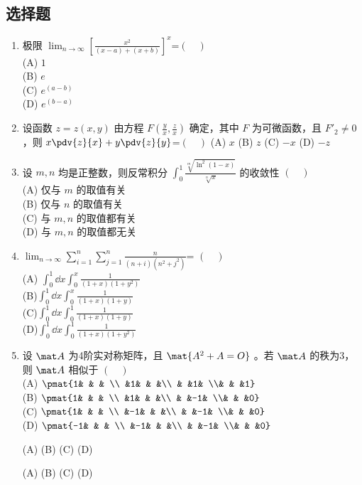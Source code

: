 
\subsection{选择题}
\begin{enumerate}
\item 极限  $\displaystyle \lim_{n\to\infty}[\frac{x^2}{(x-a)+(x+b)}]^x$=$(\quad )$\\
(A) $1$\\
(B) $e$\\
(C) $e^(a-b)$\\
(D) $e^(b-a)$
\item  设函数 $z=z(x,y)$ 由方程 $\displaystyle F(\frac{y}{x},\frac{z}{x})$ 确定，其中 $F$ 为可微函数，且 $F'_2 \neq0$ ，则  $\displaystyle x \pdv{z}{x}+y\pdv{z}{y}$=$(\quad )$
(A)  $x$
(B)  $z$
(C) $-x$
(D)  $-z$
\item 设 $m,n$ 均是正整数，则反常积分 $\displaystyle \int_0^1 \frac{\sqrt[m]{\ln^2(1-x)}}{\sqrt[n]{x}}$ 的收敛性 $(\quad )$\\
(A) 仅与 $m$ 的取值有关\\
(B) 仅与 $n$ 的取值有关\\
(C)  与 $m,n$ 的取值都有关\\
(D)  与 $m,n$ 的取值都无关
\item $\displaystyle \lim_{n\to\infty} \sum_{i=1}^n \sum_{j=1}^n \frac{n}{(n+i)(n^2+j^2)}$= $(\quad )$\\
(A) $\displaystyle \int_{0}^{1}\dd{x}\int_{0}^{x} \frac{1}{(1+x)(1+y^2)}$\\
(B)$\displaystyle \int_{0}^{1}\dd{x}\int_{0}^{x} \frac{1}{(1+x)(1+y)}$\\
(C)$\displaystyle \int_{0}^{1}\dd{x}\int_{0}^{1} \frac{1}{(1+x)(1+y)}$\\
(D)$\displaystyle \int_{0}^{1}\dd{x}\int_{0}^{1} \frac{1}{(1+x)(1+y^2)}$
\item 设 $\mat A$ 为4阶实对称矩阵，且 $\mat {A^2+A=O}$  。若 $\mat A$ 的秩为3，则 $\mat A$  相似于 $(\quad )$\\
(A) $\pmat{1& & &  \\ &1& & &\\ & &1& \\& & &1}$\\
(B) $\pmat{1& & &  \\ &1& & &\\ & &-1& \\& & &0}$\\
(C) $\pmat{1& & &  \\ &-1& & &\\ & &-1& \\& & &0}$\\
(D) $\pmat{-1& & &  \\ &-1& & &\\ & &-1& \\& & &0}$

(A) 
(B)
(C)
(D)


(A) 
(B)
(C)
(D)

\end{enumerate}